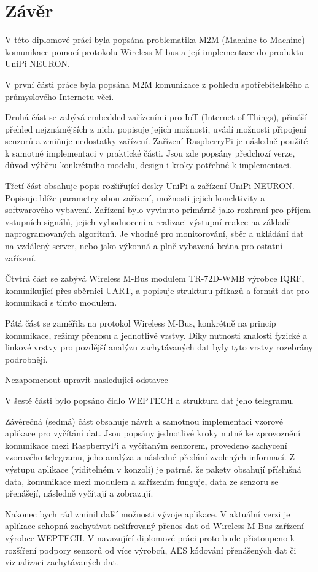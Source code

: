 \chapter{Závěr}

V této diplomové práci byla popsána problematika M2M (Machine to Machine) komunikace pomocí protokolu Wireless M-bus a její implementace do produktu UniPi NEURON.


V první části práce byla popsána M2M komunikace z pohledu spotřebitelského a průmyslového Internetu věcí.

Druhá část se zabývá embedded zařízeními pro IoT (Internet of Things), přináší přehled nejznámějších z nich, popisuje jejich možnosti, uvádí možnosti připojení senzorů a zmiňuje nedostatky zařízení. Zařízení RaspberryPi je následně použité k samotné implementaci v praktické části. Jsou zde popsány předchozí verze, důvod výběru konkrétního modelu, design i kroky potřebné k implementaci.

Třetí část obsahuje popis rozšiřující desky UniPi a zařízení UniPi NEURON. Popisuje blíže parametry obou zařízení, možnosti jejich konektivity a softwarového vybavení. Zařízení bylo vyvinuto primárně jako rozhraní pro příjem vstupních signálů, jejich vyhodnocení a realizaci výstupní reakce na základě naprogramovaných algoritmů. Je vhodné pro monitorování, sběr a ukládání dat na vzdálený server, nebo jako výkonná a plně vybavená brána pro ostatní zařízení.

Čtvtrá část se zabývá Wireless M-Bus modulem TR-72D-WMB výrobce IQRF, komunikující přes sběrnici UART, a popisuje strukturu příkazů a formát dat pro komunikaci s tímto modulem.

Pátá část se zaměřila na protokol Wireless M-Bus, konkrétně na princip komunikace, režimy přenosu a jednotlivé vrstvy. 
Díky nutnosti znalosti fyzické a linkové vrstvy pro pozdější analýzu zachytávaných dat byly tyto vrstvy rozebrány podrobněji. 

\colorbox[rgb]{0,1,0}{Nezapomenout upravit nasledujici odstavce}

V šesté části bylo popsáno čidlo WEPTECH a struktura dat jeho telegramu.

Závěrečná (sedmá) část obsahuje návrh a samotnou implementaci vzorové aplikace pro vyčítání dat. Jsou popsány jednotlivé kroky nutné ke zprovoznění komunikace mezi RaspberryPi a vyčítaným senzorem, provedeno zachycení vzorového telegramu, jeho analýza a následné předání zvolených informací. Z výstupu aplikace (viditelném v konzoli) je patrné, že pakety obsahují příslušná data, komunikace mezi modulem a zařízením funguje, data ze senzoru se přenášejí, následně vyčítají a zobrazují.


Nakonec bych rád zmínil další možnosti vývoje aplikace. V aktuální verzi je aplikace schopná zachytávat nešifrovaný přenos dat od Wireless M-Bus zařízení výrobce WEPTECH. V navazující diplomové práci proto bude přistoupeno k rozšíření podpory senzorů od více výrobců, AES kódování přenášených dat či vizualizaci zachytávaných dat.